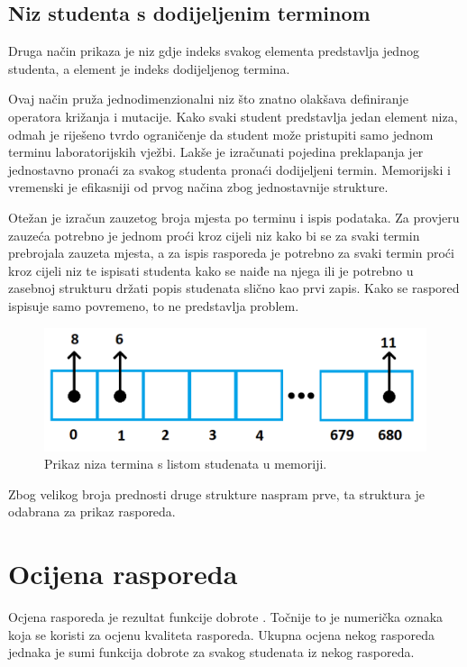 \documentclass[times, utf8, zavrsni]{fer}
\begin{document}
\subsection{Niz studenta s dodijeljenim terminom}

Druga način prikaza je niz gdje indeks svakog elementa predstavlja jednog studenta, a element je indeks dodijeljenog termina.

Ovaj način pruža jednodimenzionalni niz što znatno olakšava definiranje operatora križanja i mutacije. Kako svaki student predstavlja jedan element niza, odmah je riješeno tvrdo ograničenje da student može pristupiti samo jednom terminu laboratorijskih vježbi. Lakše je izračunati pojedina preklapanja jer jednostavno pronaći za svakog studenta pronaći dodijeljeni termin. Memorijski i vremenski je efikasniji od prvog načina zbog jednostavnije strukture.

Otežan je izračun zauzetog broja mjesta po terminu i ispis podataka. Za provjeru zauzeća potrebno je jednom proći  kroz cijeli niz kako bi se za svaki termin prebrojala zauzeta mjesta, a za ispis rasporeda je potrebno za svaki termin proći kroz cijeli niz te ispisati studenta kako se naiđe na njega ili je potrebno u zasebnoj strukturu držati popis studenata slično kao prvi zapis. Kako se raspored ispisuje samo povremeno, to ne predstavlja problem.

\begin{figure}[htb]
\centering
\includegraphics[width=13cm]{images/prikaz_jednike_2.png}
\caption{Prikaz niza termina s listom studenata u memoriji.}
\label{fig:prikaz_jednike_2}
\end{figure}

Zbog velikog broja prednosti druge strukture naspram prve, ta struktura je odabrana za prikaz rasporeda.

\section{Ocijena rasporeda}

Ocjena rasporeda je rezultat funkcije dobrote . Točnije to je numerička oznaka koja se koristi za ocjenu kvaliteta rasporeda. Ukupna ocjena nekog rasporeda jednaka je sumi funkcija dobrote za svakog studenata iz nekog rasporeda.
\end{document}
